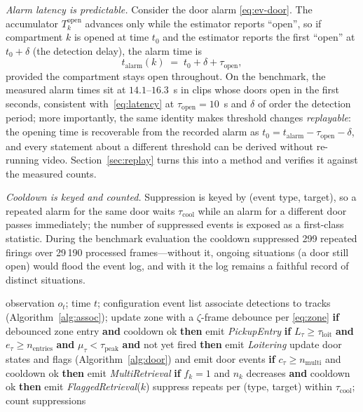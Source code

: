 \documentclass[journal,article,submit,oneauthor]{Definitions/mdpi}
\begin{document}
\emph{Alarm latency is predictable.} Consider the door alarm \eqref{eq:ev-door}. The
accumulator $T^{\mathrm{open}}_k$ advances only while the estimator reports ``open'', so if
compartment $k$ is opened at time $t_0$ and the estimator reports the first ``open'' at
$t_0+\delta$ (the detection delay), the alarm time is
\begin{equation}
\label{eq:latency}
t_{\mathrm{alarm}}(k) \;=\; t_0 + \delta + \tau_{\mathrm{open}},
\end{equation}
provided the compartment stays open throughout. On the benchmark, the measured alarm times
sit at $14.1$--$16.3$~s in clips whose doors open in the first seconds, consistent
with~\eqref{eq:latency} at $\tau_{\mathrm{open}}=10$~s and $\delta$ of order the detection
period; more importantly, the same identity makes threshold changes \emph{replayable}: the
opening time is recoverable from the recorded alarm as $t_0 = t_{\mathrm{alarm}} -
\tau_{\mathrm{open}} - \delta$, and every statement about a different threshold can be
derived without re-running video. Section~\ref{sec:replay} turns this into a method and
verifies it against the measured counts.

\emph{Cooldown is keyed and counted.} Suppression is keyed by (event type, target), so a
repeated alarm for the same door waits $\tau_{\mathrm{cool}}$ while an alarm for a different
door passes immediately; the number of suppressed events is exposed as a first-class
statistic. During the benchmark evaluation the cooldown suppressed 299 repeated firings over
29\,190 processed frames---without it, ongoing situations (a door still open) would flood the
event log, and with it the log remains a faithful record of distinct situations.

\begin{algorithm}[H]
\caption{Behaviour rule engine (per frame).}
\label{alg:rules}
\begin{algorithmic}[1]
\Require observation $o_t$; time $t$; configuration
\Ensure event list
\State associate detections to tracks (Algorithm~\ref{alg:assoc}); update zone with a
       $\zeta$-frame debounce per \eqref{eq:zone}
\State \textbf{if} debounced zone entry \textbf{and} cooldown ok \textbf{then} emit
       \emph{PickupEntry}
\State \textbf{if} $L_\tau \ge \tau_{\mathrm{loit}}$ \textbf{and}
       $e_\tau \ge n_{\mathrm{entries}}$ \textbf{and}
       $\mu_\tau < \tau_{\mathrm{peak}}$ \textbf{and} not yet fired \textbf{then} emit
       \emph{Loitering}
\State update door states and flags (Algorithm~\ref{alg:door}) and emit door events
\State \textbf{if} $c_\tau \ge n_{\mathrm{multi}}$ and cooldown ok \textbf{then} emit
       \emph{MultiRetrieval}
\State \textbf{if} $f_k=1$ and $n_k$ decreases \textbf{and} cooldown ok \textbf{then} emit
       \emph{FlaggedRetrieval}($k$)
\State suppress repeats per (type, target) within $\tau_{\mathrm{cool}}$; count suppressions
\end{algorithmic}
\end{algorithm}
\end{document}
